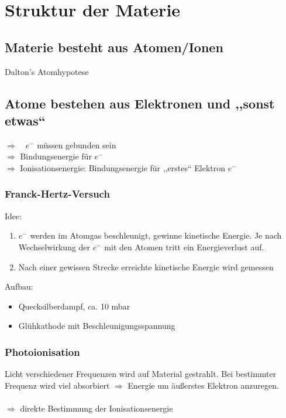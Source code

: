 \section{Struktur der Materie}

\subsection{Materie besteht aus Atomen/Ionen}

Dalton's Atomhypotese

\subsection{Atome bestehen aus Elektronen und ,,sonst etwas``}

$ \Rightarrow \quad e^- $ müssen gebunden sein\\
$ \Rightarrow $ Bindungsenergie für $ e^- $\\
$ \Rightarrow $ Ionisationsenergie: Bindungsenergie für ,,erstes`` Elektron $ e^- $

\subsubsection{Franck-Hertz-Versuch}

Idee:
\begin{enumerate}[1)]
	\item $ e^- $ werden im Atomgas beschleunigt, gewinne kinetische Energie. Je nach Wechselwirkung der $ e^- $ mit den Atomen tritt ein Energieverlust auf.
	\item Nach einer gewissen Strecke erreichte kinetische Energie wird gemessen
\end{enumerate}
Aufbau:
\begin{itemize}
	\item Quecksilberdampf, ca. 10 mbar
	\item Glühkathode mit Beschleunigungsspannung
\end{itemize}


\subsubsection{Photoionisation}

Licht verschiedener Frequenzen wird auf Material gestrahlt. Bei bestimmter Frequenz wird viel absorbiert $ \Rightarrow $ Energie um äußerstes Elektron anzuregen.\\[5pt]
\\
$ \Rightarrow $ direkte Bestimmung der Ionisationsenergie

